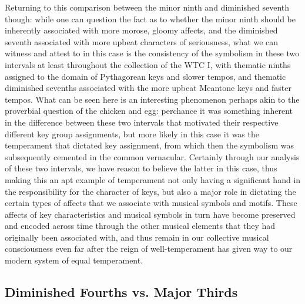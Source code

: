     Returning to this comparison between the minor ninth and diminished
seventh though: while one can question the fact as to whether the minor
ninth should be inherently associated with more morose, gloomy affects,
and the diminished seventh associated with more upbeat characters of
seriousness, what we can witness and attest to in this case is the
consistency of the symbolism in these two intervals at least throughout
the collection of the WTC I, with thematic ninths assigned to the domain
of Pythagorean keys and slower tempos, and thematic diminished sevenths
associated with the more upbeat Meantone keys and faster tempos. What
can be seen here is an interesting phenomenon perhaps akin to the
proverbial question of the chicken and egg: perchance it was something
inherent in the difference between these two intervals that motivated
their respective different key group assignments, but more likely in
this case it was the temperament that dictated key assignment, from
which then the symbolism was subsequently cemented in the common
vernacular. Certainly through our analysis of these two intervals, we
have reason to believe the latter in this case, thus making this an apt
example of temperament not only having a significant hand in the
responsibility for the character of keys, but also a major role in
dictating the certain types of affects that we associate with musical
symbols and motifs. These affects of key characteristics and musical
symbols in turn have become preserved and encoded across time through
the other musical elements that they had originally been associated
with, and thus remain in our collective musical consciousness even far
after the reign of well-temperament has given way to our modern system
of equal temperament.

    \subsection{Diminished Fourths vs. Major
Thirds}\label{diminished-fourths-vs.-major-thirds}

